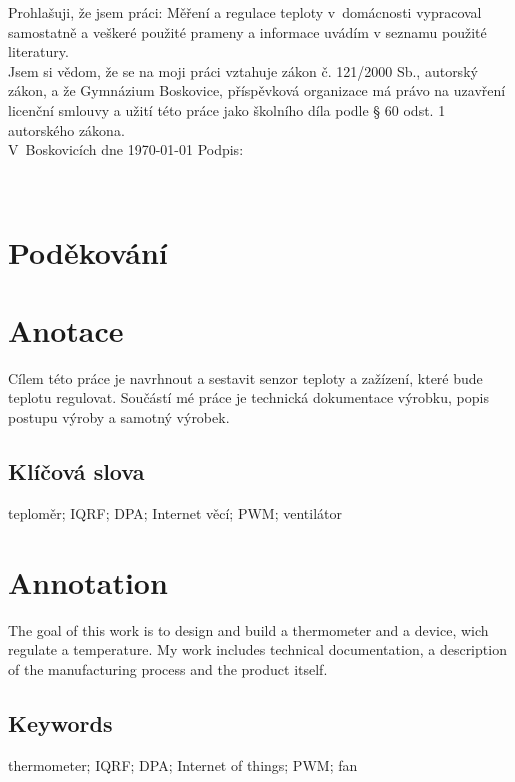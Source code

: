 \documentclass[12pt,a4paper]{article}
\begin{document}
Prohlašuji, že jsem práci: Měření a regulace teploty v~domácnosti vypracoval samostatně a veškeré použité prameny a informace uvádím v seznamu použité literatury. \\[4mm]
Jsem si vědom, že se na moji práci vztahuje zákon č. 121/2000 Sb., autorský zákon, a že Gymnázium Boskovice, příspěvková organizace má právo na uzavření licenční smlouvy a užití této práce jako školního díla podle § 60 odst. 1 autorského zákona. \\[8mm]
V~Boskovicích dne \today \hspace{24mm} Podpis:

\newpage

~ \vspace{160mm}

\section*{Poděkování}


\newpage

\section*{Anotace}

Cílem této práce je navrhnout a sestavit senzor teploty a zažízení, které bude teplotu regulovat. Součástí mé práce je technická dokumentace výrobku, popis postupu výroby a samotný výrobek.

\subsection*{Klíčová slova}

teploměr; IQRF; DPA; Internet věcí; PWM; ventilátor


\section*{Annotation}

The goal of this work is to design and build a thermometer and a device, wich regulate a temperature. My work includes technical documentation, a description of the manufacturing process and the product itself.

\subsection*{Keywords}

thermometer; IQRF; DPA; Internet of things; PWM; fan
\end{document}
